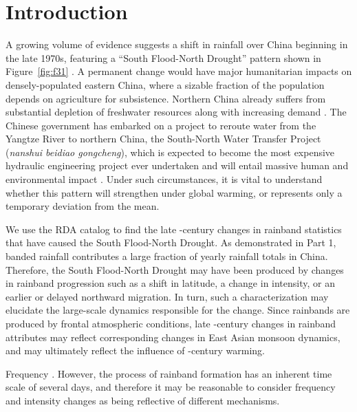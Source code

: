 \documentclass{ametsoc}
\begin{document}

\section{Introduction}

	A growing volume of evidence suggests a shift in rainfall over China beginning in the late 1970s, featuring a ``South Flood-North Drought'' pattern shown in Figure~\ref{fig:f31} \citep{Hu1997,Gong2002,Nigam2013}.  A permanent change would have major humanitarian impacts on densely-populated eastern China, where a sizable fraction of the population depends on agriculture for subsistence. Northern China already suffers from substantial depletion of freshwater resources along with increasing demand \citep{Currell2012,Gleeson2012}. The Chinese government has embarked on a project to reroute water from the Yangtze River to northern China, the South-North Water Transfer Project (\textit{nanshui beidiao gongcheng}), which is expected to become the most expensive hydraulic engineering project ever undertaken and will entail massive human and environmental impact \citep{Magee2011}. Under such circumstances, it is vital to understand whether this pattern will strengthen under global warming, or represents only a temporary deviation from the mean.
	
	We use the RDA catalog to find the late -century changes in rainband statistics that have caused the South Flood-North Drought. As demonstrated in Part 1, banded rainfall contributes a large fraction of yearly rainfall totals in China. Therefore, the South Flood-North Drought may have been produced by changes in rainband progression such as a shift in latitude, a change in intensity, or an earlier or delayed northward migration. In turn, such a characterization may elucidate the large-scale dynamics responsible for the change. Since rainbands are produced by frontal atmospheric conditions, late -century changes in rainband attributes may reflect corresponding changes in East Asian monsoon dynamics, and may ultimately reflect the influence of -century warming. 
	
	Frequency . However, the process of rainband formation has an inherent time scale of several days, and therefore it may be reasonable to consider frequency and intensity changes as being reflective of different mechanisms.
\end{document}
